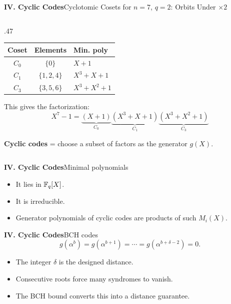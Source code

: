 \begin{frame}{\textbf{IV. Cyclic Codes}}{Cyclotomic Cosets for $n=7$, $q=2$: Orbits Under $\times 2$}
\begin{columns}[T,onlytextwidth]
\begin{column}{.47\textwidth}
    \begin{tabular}{c|c|l}
      Coset & Elements & Min. poly \\\hline
      \rowcolor{TealDarkCyan!8}
      $C_0$ & $\{0\}$ & $X+1$ \\
      $C_1$ & $\{1,2,4\}$ & $X^3+X+1$ \\
      \rowcolor{TealDarkCyan!8}
      $C_3$ & $\{3,5,6\}$ & $X^3+X^2+1$ \\
    \end{tabular}

    \medskip
    This gives the factorization:
    \[
      X^7-1 = \underbrace{(X+1)}_{C_0}\underbrace{(X^3+X+1)}_{C_1}\underbrace{(X^3+X^2+1)}_{C_3}
    \]

    \smallskip
    \textbf{Cyclic codes} = choose a subset of factors as the generator $g(X)$.
  \end{column}
\end{columns}
\end{frame}

\begin{frame}{\textbf{IV. Cyclic Codes}}{Minimal polynomials}
\small
{}
\begin{itemize}
  \item It lies in $\mathbb{F}_q[X]$.
  \item It is irreducible.
  \item Generator polynomials of cyclic codes are products of such $M_i(X)$.
\end{itemize}
\end{frame}

\begin{frame}{\textbf{IV. Cyclic Codes}}{BCH codes}
\small
{}
\[
  g(\alpha^b)=g(\alpha^{b+1})=\cdots=g(\alpha^{b+\delta-2})=0.
\]
\begin{itemize}
  \item The integer $\delta$ is the designed distance.
  \item Consecutive roots force many syndromes to vanish.
  \item The BCH bound converts this into a distance guarantee.
\end{itemize}
\end{frame}

